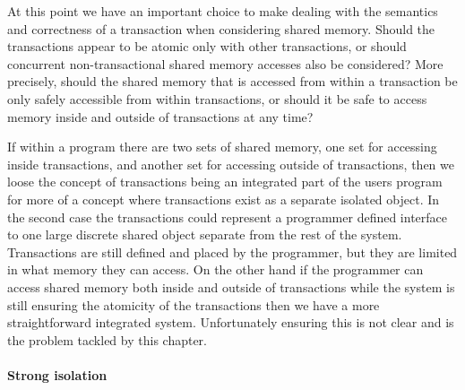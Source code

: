 \documentclass[runningheads,a4paper]{article}
\begin{document}

At this point we have an important choice to make dealing with the
semantics and correctness of a transaction when considering shared memory.
Should the transactions appear to be atomic only with other transactions, or should
concurrent non-transactional shared memory accesses also be considered?
More precisely, should the shared memory that is accessed from within a transaction
be only safely accessible from within transactions, or should it be
safe to access memory inside and outside of transactions at any time?

If within a program there are two sets of shared memory, one set for accessing inside
transactions, and another set for accessing outside of transactions, then we loose 
the concept of transactions being an integrated part of the users program for more of a
concept where transactions exist as a separate isolated object.
In the second case the transactions could represent a programmer defined
interface to one large discrete shared object separate from the rest of the system.
Transactions are still defined and placed by the programmer, but they are limited
in what memory they can access.
On the other hand if the programmer can access shared memory both inside and outside
of transactions while the system is still ensuring the atomicity of the transactions then
we have a more straightforward integrated system.
Unfortunately ensuring this is not clear and is the problem tackled by this chapter.



\paragraph{Strong isolation}
\end{document}

